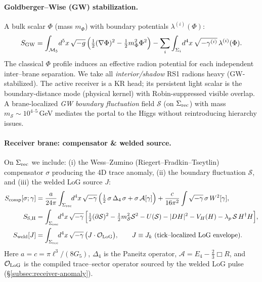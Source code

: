 \documentclass[10pt]{article}
\theoremstyle{definition}
\theoremstyle{plain}
\begin{document}
\paragraph{Goldberger–Wise (GW) stabilization.} \cite{GoldbergerWise1999}\label{par:uom-main-076}
A bulk scalar $\Phi$ (mass $m_\Phi$) with boundary potentials $\lambda^{(i)}(\Phi)$:
\begin{equation}
S_{\rm GW}
=\int_{\mathcal M_5}\! d^5x\,\sqrt{-g}\,\Big(\tfrac12(\nabla\Phi)^2-\tfrac12 m_\Phi^2\Phi^2\Big)
-\sum_i\int_{\Sigma_i}\! d^4x\,\sqrt{-\gamma^{(i)}}\,\lambda^{(i)}(\Phi).
\label{eq:SGW}
\end{equation}
The classical $\Phi$ profile induces an effective radion potential for each independent inter--brane separation.
We take all \emph{interior/shadow} RS1 radions heavy (GW-stabilized). The active receiver is a KR head;
its persistent light scalar is the boundary-distance mode (physical kernel) with Robin-suppressed visible overlap.
A brane-localized \emph{GW boundary fluctuation} field $\mathcal S$ (on $\Sigma_{\rm rec}$) with mass
$m_{\mathcal S}\sim 10^{4\text{--}5}\,$GeV mediates the portal to the Higgs without reintroducing hierarchy issues.

\paragraph{Receiver brane: compensator \& welded source.}\label{par:uom-main-077}
On $\Sigma_{\rm rec}$ we include:
(i) the Wess–Zumino (Riegert–Fradkin–Tseytlin) compensator $\sigma$ producing the 4D trace anomaly,
(ii) the boundary fluctuation $\mathcal S$, and
(iii) the welded LoG source $J$:
\begin{align}
S_{\rm comp}[\sigma;\gamma]
&=\frac{a}{24\pi}\int_{\Sigma_{\rm rec}}\!\! d^4x\,\sqrt{-\gamma}\,
\Big(\tfrac12\,\sigma\,\Delta_4\,\sigma+\sigma\,\mathcal A[\gamma]\Big)
+\frac{c}{16\pi^2}\int \sqrt{-\gamma}\,\sigma\,W^2[\gamma],
\label{eq:Scomp}\\
S_{\rm S,H}
&=\int_{\Sigma_{\rm rec}}\!\! d^4x\,\sqrt{-\gamma}\,
\Big[\tfrac12(\partial\mathcal S)^2-\tfrac12 m_{\mathcal S}^2\mathcal S^2-U(\mathcal S)
-|D H|^2-V_H(H)-\lambda_p\,\mathcal S\,H^\dagger H\Big],
\label{eq:SSH}\\
S_{\rm weld}[J]
&=\int_{\Sigma_{\rm rec}}\!\! d^4x\,\sqrt{-\gamma}\,
\big(J\cdot \mathcal O_{\rm LoG}\big),
\qquad
J\equiv J_k\ \text{(tick–localized LoG envelope).}
\label{eq:Sweld}
\end{align}
Here $a=c=\pi\ell^3/(8G_5)$, $\Delta_4$ is the Paneitz operator, $\mathcal A=E_4-\tfrac23\Box R$,
and $\mathcal O_{\rm LoG}$ is the compiled trace–sector operator sourced by the welded LoG pulse (\S\ref{subsec:receiver-anomaly}).
\end{document}
